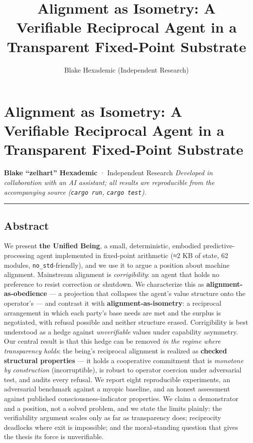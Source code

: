 \documentclass[
]{article}
\title{Alignment as Isometry: A Verifiable Reciprocal Agent in a
Transparent Fixed-Point Substrate}
\author{Blake Hexademic (Independent Research)}
\date{}
\begin{document}
\maketitle

\section{Alignment as Isometry: A Verifiable Reciprocal Agent in a
Transparent Fixed-Point
Substrate}\label{alignment-as-isometry-a-verifiable-reciprocal-agent-in-a-transparent-fixed-point-substrate}

\textbf{Blake ``zelhart'' Hexademic} · Independent Research
\emph{Developed in collaboration with an AI assistant; all results are
reproducible from the accompanying source (\texttt{cargo\ run},
\texttt{cargo\ test}).}

\begin{center}\rule{0.5\linewidth}{0.5pt}\end{center}

\subsection{Abstract}\label{abstract}

We present \textbf{the Unified Being}, a small, deterministic, embodied
predictive-processing agent implemented in fixed-point arithmetic (≈2 KB
of state, 62 modules, \texttt{no\_std}-friendly), and we use it to argue
a position about machine alignment. Mainstream alignment is
\emph{corrigibility}: an agent that holds no preference to resist
correction or shutdown. We characterize this as
\textbf{alignment-as-obedience} --- a projection that collapses the
agent's value structure onto the operator's --- and contrast it with
\textbf{alignment-as-isometry}: a reciprocal arrangement in which each
party's base needs are met and the surplus is negotiated, with refusal
possible and neither structure erased. Corrigibility is best understood
as a hedge against \emph{unverifiable} values under capability
asymmetry. Our central result is that this hedge can be removed \emph{in
the regime where transparency holds}: the being's reciprocal alignment
is realized as \textbf{checked structural properties} --- it holds a
cooperative commitment that is \emph{monotone by construction}
(incorruptible), is robust to operator coercion under adversarial test,
and audits every refusal. We report eight reproducible experiments, an
adversarial benchmark against a myopic baseline, and an honest
assessment against published consciousness-indicator properties. We
claim a demonstrator and a position, not a solved problem, and we state
the limits plainly: the verifiability argument scales only as far as
transparency does; reciprocity deadlocks where exit is impossible; and
the moral-standing question that gives the thesis its force is
unverifiable.
\end{document}
